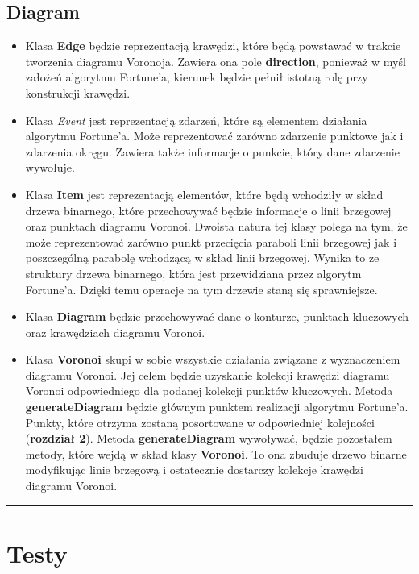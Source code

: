 \documentclass[a4paper,11pt]{article}
\newcommand{\linia}{\rule{\linewidth}{0.4mm}}
\begin{document}
\subsection{Diagram}
\begin{itemize}
\item Klasa \textbf{Edge} będzie reprezentacją krawędzi, które będą powstawać w trakcie tworzenia diagramu Voronoja. Zawiera ona pole \textbf{direction}, ponieważ w myśl założeń algorytmu Fortune'a, kierunek będzie pełnił istotną rolę przy konstrukcji krawędzi.
\item Klasa \textit{Event} jest reprezentacją zdarzeń, które są elementem działania algorytmu Fortune'a. Może reprezentować zarówno zdarzenie punktowe jak i zdarzenia okręgu. Zawiera także informacje o punkcie, który dane zdarzenie wywołuje.
\item Klasa \textbf{Item} jest reprezentacją elementów, które będą wchodziły w skład drzewa binarnego, które przechowywać będzie informacje o linii brzegowej oraz punktach diagramu Voronoi. Dwoista natura tej klasy polega na tym, że może reprezentować zarówno punkt przecięcia paraboli linii brzegowej jak i poszczególną parabolę wchodzącą w skład linii brzegowej. Wynika to ze struktury drzewa binarnego, która jest przewidziana przez algorytm Fortune'a. Dzięki temu operacje na tym drzewie staną się  sprawniejsze.
\item Klasa \textbf{Diagram} będzie przechowywać dane o konturze, punktach kluczowych oraz krawędziach diagramu Voronoi.
\item Klasa \textbf{Voronoi} skupi w sobie wszystkie działania związane z wyznaczeniem diagramu Voronoi. Jej celem będzie uzyskanie kolekcji krawędzi diagramu Voronoi odpowiedniego dla podanej kolekcji punktów kluczowych. Metoda \textbf{generateDiagram} będzie głównym punktem realizacji algorytmu Fortune'a. Punkty, które otrzyma zostaną posortowane w odpowiedniej kolejności (\textbf{rozdział 2}). Metoda \textbf{generateDiagram} wywoływać, będzie pozostałem metody, które wejdą w skład klasy \textbf{Voronoi}. To ona zbuduje drzewo binarne modyfikując linie brzegową i  ostatecznie dostarczy kolekcje krawędzi diagramu Voronoi.
\end{itemize}

\noindent\linia

\section{Testy}
\end{document}
